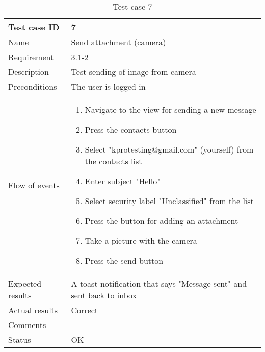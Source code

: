 		\begin{table}
			\begin{tabular}{l|p{10cm}}
				Test case ID & 7 \\ \hline
				Name & Send attachment (camera)\\ \hline
				Requirement & 3.1-2\\ \hline
				Description & Test sending of image from camera\\ \hline
				Preconditions & The user is logged in\\ \hline
				Flow of events & 
					\begin{enumerate}
						\item{}Navigate to the view for sending a new message
						\item{}Press the contacts button
						\item{}Select "kprotesting@gmail.com" (yourself) from the contacts list
						\item{}Enter subject "Hello"
						\item{}Select security label "Unclassified" from the list
						\item{}Press the button for adding an attachment
						\item{}Take a picture with the camera
						\item{}Press the send button
					\end{enumerate} \\ \hline
				Expected results & A toast notification that says "Message sent" and sent back to inbox\\ \hline
				Actual results & Correct\\ \hline
				Comments & -\\ \hline
				Status &OK \\ \hline
			\end{tabular}
			\caption{Test case 7} \label{tab:case7}
		\end{table}


